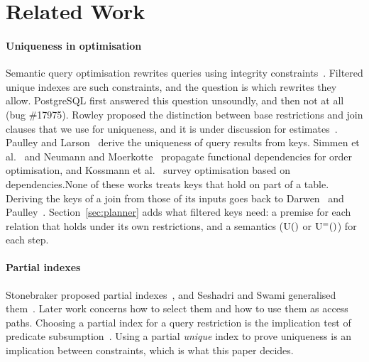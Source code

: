 \documentclass[conference]{IEEEtran}
\theoremstyle{definition}
\newcommand{\U}[1]{\mathrm{U}(#1)}
\newcommand{\Ueq}[1]{\mathrm{U}^{=}(#1)}
\newif\ifextended
\begin{document}
\section{Related Work}\label{sec:related}

\paragraph*{Uniqueness in optimisation} Semantic query optimisation rewrites queries using integrity
constraints~\cite{King81,CGM90}. Filtered unique indexes are such constraints, and the question is which rewrites they
allow. PostgreSQL first answered this question unsoundly, and then not at all (bug \#17975). Rowley proposed the
distinction between base restrictions and join clauses that we use for uniqueness, and it is under discussion for
estimates~\cite{Yan26}. Paulley and Larson~\cite{PL94} derive the uniqueness of query results from keys. Simmen et
al.~\cite{SSM96} and Neumann and Moerkotte~\cite{NM04} propagate functional dependencies for order optimisation, and
Kossmann et al.~\cite{KPN22} survey optimisation based on dependencies.\ifextended{} Godfrey et al.~\cite{GGZ01} exploit characterisations of the data that behave like constraints.\fi None of these works treats keys that hold on part of a table.
Deriving the keys of a join from those of its inputs goes back to Darwen~\cite{Dar92} and Paulley~\cite{Pau00}.
Section~\ref{sec:planner} adds what filtered keys need: a premise for each relation that holds under its own
restrictions, and a semantics ($\U$ or $\Ueq$) for each step.\ifextended{} The recommender of Section~\ref{sec:discovery} fits with lazy discovery of dependencies for
the optimiser, driven by the workload~\cite{KLNP22}.\fi

\paragraph*{Partial indexes} Stonebraker proposed partial indexes~\cite{Sto89}, and Seshadri and Swami generalised
them~\cite{SS95}. Later work concerns how to select them and how to use them as access paths. Choosing a partial index
for a query restriction is the implication test of predicate subsumption~\cite{LY85,GL01}. Using a partial \emph{unique}
index to prove uniqueness is an implication between constraints, which is what this paper decides.
\end{document}
